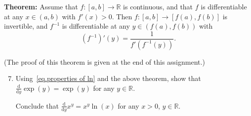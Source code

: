 \documentclass[12 pt,letterpaper]{article}
\newcommand{\bbR}{\mathbb{R}}
\newcommand{\rmd}{\mathrm{d}}
\begin{document}
\noindent
\textbf{Theorem:} Assume that $f:[a,b]\rightarrow\bbR$ is continuous,
and that $f$ is differentiable at any $x\in(a,b)$ with $f'(x)>0$.
Then $f:[a,b]\rightarrow[f(a),f(b)]$ is invertible,
and $f^{-1}$ is differentiable at any $y\in(f(a),f(b))$ with
\begin{equation*}
(f^{-1})'(y)=\frac1{f'(f^{-1}(y))}.
\end{equation*}

\noindent(The proof of this theorem is given at the end of this assignment.)

\begin{enumerate}
\setcounter{enumi}{6}
\item
Using~\eqref{eq.properties of ln} and the above theorem,
show that $\displaystyle\frac{\rmd}{\rmd y}\exp(y)=\exp(y)$ for any $y\in\bbR$.

Conclude that $\displaystyle\frac{\rmd}{\rmd y}x^y=x^y\ln(x)$ for any $x>0$, $y\in\bbR$.

\end{enumerate}

\newpage
\end{document}
